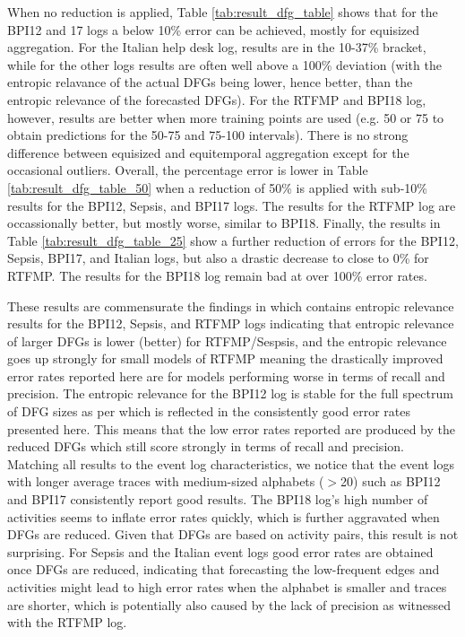 When no reduction is applied, Table \ref{tab:result_dfg_table} shows that for the BPI12 and 17 logs a below 10\% error can be achieved, mostly for equisized aggregation. 
For the Italian help desk log, results are in the 10-37\% bracket, while for the other logs results are often well above a 100\% deviation (with the entropic relavance of the actual DFGs being lower, hence better, than the entropic relevance of the forecasted DFGs).
For the RTFMP and BPI18 log, however, results are better when more training points are used (e.g. 50 or 75 to obtain predictions for the 50-75 and 75-100 intervals).
There is no strong difference between equisized and equitemporal aggregation except for the occasional outliers.
Overall, the percentage error is lower in Table \ref{tab:result_dfg_table_50} when a reduction of 50\% is applied with sub-10\% results for the BPI12, Sepsis, and BPI17 logs. 
The results for the RTFMP log are occassionally better, but mostly worse, similar to BPI18.
Finally, the results in Table \ref{tab:result_dfg_table_25} show a further reduction of errors for the BPI12, Sepsis, BPI17, and Italian logs, but also a drastic decrease to close to 0\% for RTFMP.
The results for the BPI18 log remain bad at over 100\% error rates.

These results are commensurate the findings in \cite{DBLP:conf/icpm/PolyvyanyyMG20} which contains entropic relevance results for the BPI12, Sepsis, and RTFMP logs indicating that entropic relevance of larger DFGs is lower (better) for RTFMP/Sespsis, and the entropic relevance goes up strongly for small models of RTFMP meaning the drastically improved error rates reported here are for models performing worse in terms of recall and precision.
The entropic relevance for the BPI12 log is stable for the full spectrum of DFG sizes as per \cite{DBLP:conf/icpm/PolyvyanyyMG20} which is reflected in the consistently good error rates presented here.
This means that the low error rates reported are produced by the reduced DFGs which still score strongly in terms of recall and precision.
Matching all results to the event log characteristics, we notice that the event logs with longer average traces with medium-sized alphabets ($>$20) such as BPI12 and BPI17 consistently report good results.
The BPI18 log's high number of activities seems to inflate error rates quickly, which is further aggravated when DFGs are reduced.
Given that DFGs are based on activity pairs, this result is not surprising.
For Sepsis and the Italian event logs good error rates are obtained once DFGs are reduced, indicating that forecasting the low-frequent edges and activities might lead to high error rates when the alphabet is smaller and traces are shorter, which is potentially also caused by the lack of precision as witnessed with the RTFMP log.

